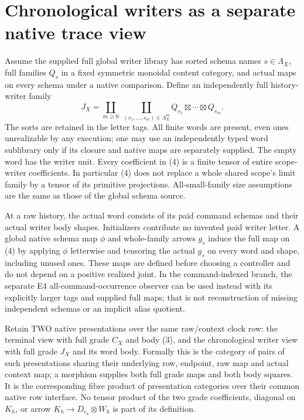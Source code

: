 \documentclass[11pt]{article}\usepackage{amsmath,amssymb,amsthm,geometry}\geometry{margin=1in}\newtheorem{definition}{Definition}\newtheorem{theorem}[definition]{Theorem}\newtheorem{proposition}[definition]{Proposition}
\begin{document}
\section{Chronological writers as a separate native trace view}
Assume the supplied full global writer library has sorted schema names $s\in\Lambda_X$, full families $Q_s$ in a fixed symmetric monoidal content category, and actual maps on every schema under a native comparison. Define an independently full history-writer family
\[
 J_X=\coprod_{m\geq0}\ \coprod_{(s_1,\ldots,s_m)\in\Lambda_X^m}
                         Q_{s_1}\boxtimes\cdots\boxtimes Q_{s_m}. \tag{4}
\]
The sorts are retained in the letter tags. All finite words are present, even ones unrealizable by any execution; one may use an independently typed word sublibrary only if its closure and native maps are separately supplied. The empty word has the writer unit. Every coefficient in (4) is a finite tensor of entire scope-writer coefficients. In particular (4) does not replace a whole shared scope's limit family by a tensor of its primitive projections. All-small-family size assumptions are the same as those of the global schema source.

At a raw history, the actual word consists of its paid command schemas and their actual writer body shapes. Initializers contribute no invented paid writer letter. A global native schema map $\phi$ and whole-family arrows $g_s$ induce the full map on (4) by applying $\phi$ letterwise and tensoring the actual $g_s$ on every word and shape, including unused ones. These maps are defined before choosing a controller and do not depend on a positive realized joint. In the command-indexed branch, the separate E4 all-command-occurrence observer can be used instead with its explicitly larger tags and supplied full maps; that is not reconstruction of missing independent schemas or an implicit alias quotient.

Retain TWO native presentations over the same raw/context clock row: the terminal view with full grade $C_X$ and body (3), and the chronological writer view with full grade $J_X$ and its word body. Formally this is the category of pairs of such presentations sharing their underlying row, endpoint, raw map and actual context map; a morphism supplies both full grade maps and both body squares. It is the corresponding fibre product of presentation categories over their common native row interface. No tensor product of the two grade coefficients, diagonal on $K_h$, or arrow $K_h\to D_{c_h}\otimes W_h$ is part of its definition.
\end{document}
